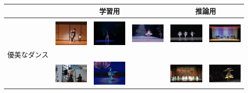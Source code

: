 \begin{table}[t]
  \begin{center}
    \begin{tabular}{|c|ccc|cc|} \hline
        & \multicolumn{3}{|c|}{学習用} & \multicolumn{2}{|c|}{推論用} \\ \hline
        &&&&& \\
        & \includegraphics[width=17mm]{images/snaps/japanese_elegant.png}
        & \includegraphics[width=17mm]{images/snaps/chinese_elegant.png}
        & \includegraphics[width=17mm]{images/snaps/ballet_elegant.png}
        & \includegraphics[width=17mm]{images/snaps/ballet_group_elegant.png}
        & \includegraphics[width=17mm]{images/snaps/japanese_group_elegant.png}
      \\
      優美なダンス & \cite{jpn} & \cite{china} & \cite{ballet} & \cite{balletgroup} & \cite{jpngroup}
      \\
        & \includegraphics[width=17mm]{images/snaps/thai_elegant.png}
        & \includegraphics[width=17mm]{images/snaps/japanese2_elegant.png}
        &
        & \includegraphics[width=17mm]{images/snaps/chinese_group_elegant.png}
        & \includegraphics[width=17mm]{images/snaps/belly_elegant.png}

\end{tabular}
\end{center}
\end{table}
